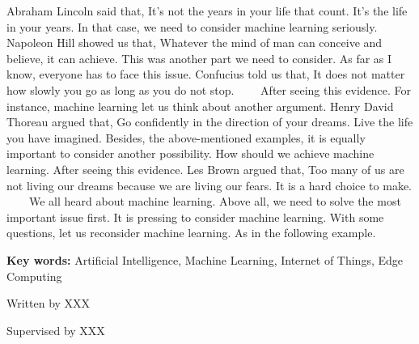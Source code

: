 
\begin{eabstract}
	Abraham Lincoln said that, It’s not the years in your life that count. It’s the life in your years. In that case, we need to consider machine learning seriously. Napoleon Hill showed us that, Whatever the mind of man can conceive and believe, it can achieve. This was another part we need to consider. As far as I know, everyone has to face this issue. Confucius told us that, It does not matter how slowly you go as long as you do not stop.
　　After seeing this evidence. For instance, machine learning let us think about another argument. Henry David Thoreau argued that, Go confidently in the direction of your dreams. Live the life you have imagined. Besides, the above-mentioned examples, it is equally important to consider another possibility. How should we achieve machine learning. After seeing this evidence. Les Brown argued that, Too many of us are not living our dreams because we are living our fears. It is a hard choice to make.
　　We all heard about machine learning. Above all, we need to solve the most important issue first. It is pressing to consider machine learning. With some questions, let us reconsider machine learning. As in the following example.

	\vskip 21bp
	{\bf{} Key words: }
	Artificial Intelligence,
	Machine Learning,
	Internet of Things,
	Edge Computing
\end{eabstract}

\begin{flushright}
	Written by XXX
	
	Supervised by XXX
\end{flushright}
